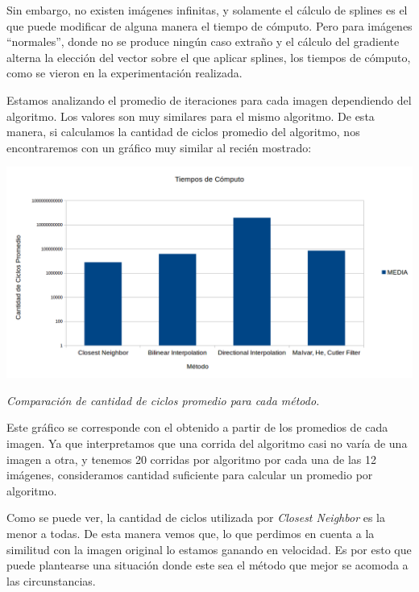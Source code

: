 \begin{itemize}
Sin embargo, no existen imágenes infinitas, y solamente el cálculo de splines es el que puede modificar de alguna manera el tiempo de cómputo. Pero para imágenes ``normales'', donde no se produce ningún caso extraño y el cálculo del gradiente alterna la elección del vector sobre el que aplicar splines, los tiempos de cómputo, como se vieron en la experimentación realizada.


\vspace{2\baselineskip}

Estamos analizando el promedio de iteraciones para cada imagen dependiendo del algoritmo. Los valores son muy similares para el mismo algoritmo. De esta manera, si calculamos la cantidad de ciclos promedio del algoritmo, nos encontraremos con un gráfico muy similar al recién mostrado:

	\begin{center}
		\includegraphics[scale=0.4]{./img/tiemposDeComputo.png}
		\vspace{2pt}
		\par
		\footnotesize\textit{Comparación de cantidad de ciclos promedio para cada método.}
	\end{center}

Este gráfico se corresponde con el obtenido a partir de los promedios de cada imagen. Ya que interpretamos que una corrida del algoritmo casi no varía de una imagen a otra, y tenemos 20 corridas por algoritmo por cada una de las 12 imágenes, consideramos cantidad suficiente para calcular un promedio por algoritmo.

\vspace{\baselineskip}

Como se puede ver, la cantidad de ciclos utilizada por \textit{Closest Neighbor} es la menor a todas. De esta manera vemos que, lo que perdimos en cuenta a la similitud con la imagen original lo estamos ganando en velocidad. Es por esto que puede plantearse una situación donde este sea el método que mejor se acomoda a las circunstancias. 


\end{itemize}
